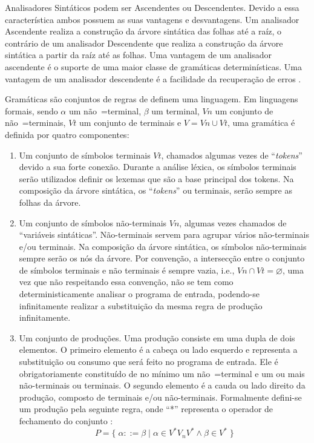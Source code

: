 {    Analisadores Sintáticos podem ser Ascendentes ou Descendentes.
    Devido a essa característica ambos possuem as suas vantagens e
    desvantagens.
    Um analisador Ascendente realiza a construção da árvore sintática das folhas até a raíz,
    o contrário de um analisador Descendente que realiza a construção
    da árvore sintática a partir da raíz até as folhas.
    Uma vantagem de um analisador ascendente é o suporte
    de uma maior classe de gramáticas determinísticas.
    Uma vantagem de um analisador descendente é a facilidade
    da recuperação de erros \cite{ahoCompilerDragonBook}.

    Gramáticas são conjuntos de regras de definem uma linguagem.
    Em linguagens formais,
    sendo $\alpha$ um não~=terminal,
    $\beta$ um terminal,
    $Vn$ um conjunto de não~=terminais,
    $Vt$ um conjunto de terminais e
    $V = Vn \cup Vt$,
    uma gramática é definida por quatro componentes:
    \begin{enumerate}%
        \item Um conjunto de símbolos terminais $Vt$,
        chamados algumas vezes de ``\textit{tokens}'' devido a sua forte conexão.
        Durante a análise léxica,
        os símbolos terminais serão utilizados definir os lexemas que são a base principal dos tokens.
        Na composição da árvore sintática,
        os ``\textit{tokens}'' ou terminais,
        serão sempre as folhas da árvore.

        \item Um conjunto de símbolos não-terminais $Vn$,
        algumas vezes chamados de ``variáveis sintáticas''.
        Não-terminais servem para agrupar vários não-terminais e/ou terminais.
        Na composição da árvore sintática,
        os símbolos não-terminais sempre serão os nós da árvore.
        Por convenção,
        a intersecção entre o conjunto de símbolos terminais e
        não terminais é sempre vazia, i.e., $Vn \cap Vt = \varnothing$,
        uma vez que não respeitando essa convenção,
        não se tem como deterministicamente analisar o programa de entrada,
        podendo-se infinitamente realizar a substituição da mesma regra de produção infinitamente.

        \item Um conjunto de produções.
        Uma produção consiste em uma dupla de dois elementos.
        O primeiro elemento é a cabeça ou lado esquerdo e
        representa a substituição ou consumo que será feito no programa de entrada.
        Ele é obrigatoriamente constituído de no mínimo um não~=terminal e
        um ou mais não-terminais ou terminais.
        O segundo elemento é a cauda ou lado direito da produção,
        composto de terminais e/ou não-terminais.
        Formalmente defini-se um produção pela seguinte regra,
        onde ``*'' representa o operador de fechamento do conjunto \cite{hopcroftBook}:
        $$ P = \{\; \alpha ::= \beta \;|\; \alpha \in V^* V_n V^* \land \beta \in V^* \;\} $$


\end{enumerate}}
